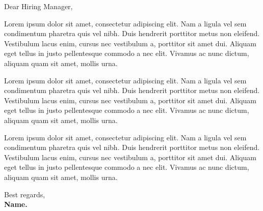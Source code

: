 \documentclass[a4paper,11pt]{letter}
\begin{document}

\normalsize Dear Hiring Manager,

\small \noindent
Lorem ipsum dolor sit amet, consectetur adipiscing elit. Nam a ligula vel sem condimentum pharetra quis vel nibh. Duis hendrerit porttitor metus non eleifend. Vestibulum lacus enim, cursus nec vestibulum a, porttitor sit amet dui. Aliquam eget tellus in justo pellentesque commodo a nec elit. Vivamus ac nunc dictum, aliquam quam sit amet, mollis urna.

\vspace{1pt}
Lorem ipsum dolor sit amet, consectetur adipiscing elit. Nam a ligula vel sem condimentum pharetra quis vel nibh. Duis hendrerit porttitor metus non eleifend. Vestibulum lacus enim, cursus nec vestibulum a, porttitor sit amet dui. Aliquam eget tellus in justo pellentesque commodo a nec elit. Vivamus ac nunc dictum, aliquam quam sit amet, mollis urna.

\vspace{1pt}
Lorem ipsum dolor sit amet, consectetur adipiscing elit. Nam a ligula vel sem condimentum pharetra quis vel nibh. Duis hendrerit porttitor metus non eleifend. Vestibulum lacus enim, cursus nec vestibulum a, porttitor sit amet dui. Aliquam eget tellus in justo pellentesque commodo a nec elit. Vivamus ac nunc dictum, aliquam quam sit amet, mollis urna.


\bigskip
\noindent
Best regards,\\
\textbf{Name.}
\end{document}
